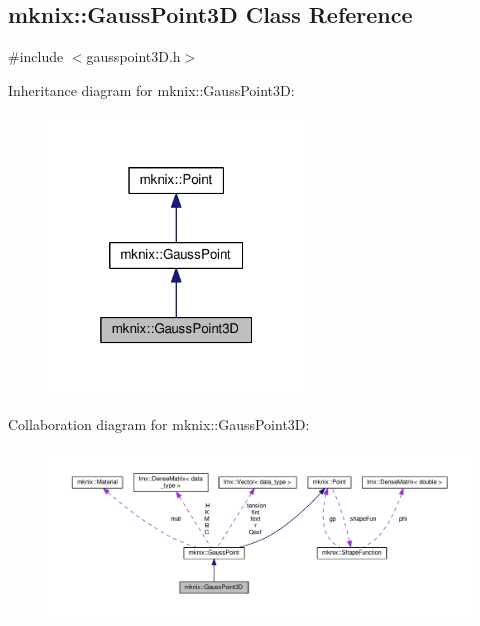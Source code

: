\hypertarget{classmknix_1_1_gauss_point3_d}{}\subsection{mknix\+:\+:Gauss\+Point3\+D Class Reference}
\label{classmknix_1_1_gauss_point3_d}


{\ttfamily \#include $<$gausspoint3\+D.\+h$>$}



Inheritance diagram for mknix\+:\+:Gauss\+Point3\+D\+:\nopagebreak
\begin{figure}[H]
\begin{center}
\leavevmode
\includegraphics[width=193pt]{da/dac/classmknix_1_1_gauss_point3_d__inherit__graph}
\end{center}
\end{figure}


Collaboration diagram for mknix\+:\+:Gauss\+Point3\+D\+:\nopagebreak
\begin{figure}[H]
\begin{center}
\leavevmode
\includegraphics[width=350pt]{d9/d5b/classmknix_1_1_gauss_point3_d__coll__graph}
\end{center}
\end{figure}
